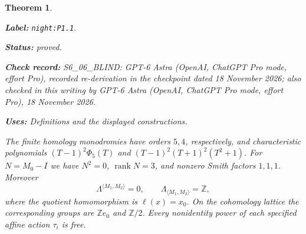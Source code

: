 \documentclass[11pt,a4paper]{article}
\newtheorem{theorem}{Theorem}[section]
\theoremstyle{definition}
\newcommand{\StatementRecord}[4]{\par\smallskip\begingroup\upshape\raggedright\noindent\textbf{Label:} \nolinkurl{#1}.\par\noindent\textbf{Status:} #2.\par\noindent\textbf{Check record:} #3.\par\noindent\textbf{Uses:} #4.\par\endgroup\smallskip}
\newcommand{\CurrentChecker}{GPT-6 Astra (OpenAI, ChatGPT Pro mode, effort Pro), 18 November 2026}
\begin{document}
\begin{theorem}\label{night:P1.1}
\StatementRecord{night:P1.1}{proved}{S6\_06\_BLIND: GPT-6 Astra (OpenAI, ChatGPT Pro mode, effort Pro), recorded re-derivation in the checkpoint dated 18 November 2026; also checked in this writing by \CurrentChecker}{Definitions and the displayed constructions}
The finite homology monodromies have orders $5,4$, respectively, and
characteristic polynomials
$(T-1)^2\Phi _5(T)$ and $(T-1)^2(T+1)^2(T^2+1)$.
For $N=M_0-I$ we have $N^2=0$, $\operatorname{rank}N=3$, and
nonzero Smith factors $1,1,1$.  Moreover
\[
 \Lambda^{\langle M_1,M_2\rangle}=0,\qquad
 \Lambda_{\langle M_1,M_2\rangle}=\mathbb Z,
\]
where the quotient homomorphism is $\ell(x)=x_0$.
On the cohomology lattice the corresponding groups are $\mathbb Ze_0$
and $\mathbb Z/2$.  Every nonidentity power of each specified affine
action $\tau_i$ is free.
\end{theorem}
\end{document}
